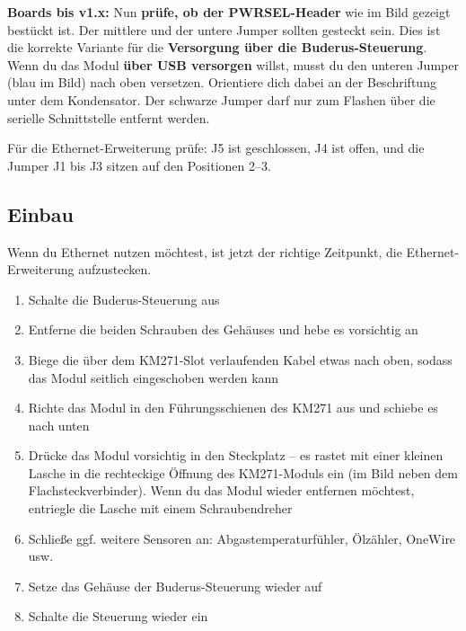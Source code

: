 \documentclass[
  9pt,
]{extarticle}
\providecommand{\tightlist}{%
  \setlength{\itemsep}{0pt}\setlength{\parskip}{0pt}}
\begin{document}
\textbf{Boards bis v1.x:} Nun \textbf{prüfe, ob der PWRSEL-Header} wie im Bild gezeigt bestückt
ist. Der mittlere und der untere Jumper sollten gesteckt sein. Dies ist
die korrekte Variante für die \textbf{Versorgung über die
Buderus-Steuerung}. Wenn du das Modul \textbf{über USB versorgen}
willst, musst du den unteren Jumper (blau im Bild) nach oben versetzen.
Orientiere dich dabei an der Beschriftung unter dem Kondensator. Der
schwarze Jumper darf nur zum Flashen über die serielle Schnittstelle
entfernt werden.

Für die Ethernet-Erweiterung prüfe: J5 ist geschlossen, J4 ist offen,
und die Jumper J1 bis J3 sitzen auf den Positionen 2--3.

\subsection{Einbau}\label{einbau}

Wenn du Ethernet nutzen möchtest, ist jetzt der richtige Zeitpunkt, die
Ethernet-Erweiterung aufzustecken.

\begin{enumerate}
\def\labelenumi{\arabic{enumi}.}
\tightlist
\item
  Schalte die Buderus-Steuerung aus\\
\item
  Entferne die beiden Schrauben des Gehäuses und hebe es vorsichtig an\\
\item
  Biege die über dem KM271-Slot verlaufenden Kabel etwas nach oben,
  sodass das Modul seitlich eingeschoben werden kann\\
\item
  Richte das Modul in den Führungsschienen des KM271 aus und schiebe es
  nach unten\\
\item
  Drücke das Modul vorsichtig in den Steckplatz -- es rastet mit einer
  kleinen Lasche in die rechteckige Öffnung des KM271-Moduls ein (im
  Bild neben dem Flachsteckverbinder). Wenn du das Modul wieder
  entfernen möchtest, entriegle die Lasche mit einem Schraubendreher\\
\item
  Schließe ggf. weitere Sensoren an: Abgastemperaturfühler, Ölzähler,
  OneWire usw.\\
\item
  Setze das Gehäuse der Buderus-Steuerung wieder auf\\
\item
  Schalte die Steuerung wieder ein
\end{enumerate}
\end{document}
